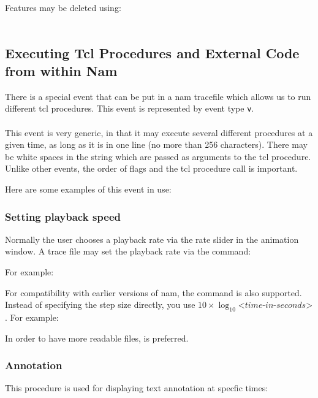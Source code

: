 Features may be deleted using:\\
\\

\subsection{Executing Tcl Procedures and External Code from within Nam}

There is a special event that can be put in a nam tracefile which allows us
to run different tcl procedures. This event is represented by event type {\tt v}.\\
\\
This event is very generic, in that it may execute several different procedures
at a given time, as long as it is in one line (no more than 256 characters).
There may be white spaces in the string which are passed as arguments to the tcl
procedure.  Unlike other events, the order of flags and the tcl procedure
call is important.

Here are some examples of this event in use:

\subsubsection{Setting playback speed}
Normally the user chooses a playback rate via the rate slider in the animation window.  A trace file may set the playback rate via the  command:


For example:\\

For compatibility with earlier versions of nam, the  command is also supported.  Instead of specifying the step size directly, you use $10\times\log_{10} \textit{<time-in-seconds>}$.  For example:


In order to have more readable files,  is preferred.

\subsubsection{Annotation}
This procedure is used for displaying text annotation at specfic times:

